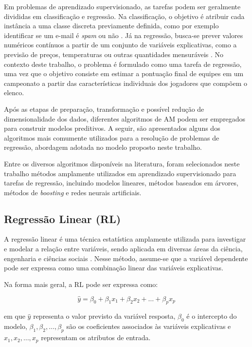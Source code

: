 Em problemas de aprendizado supervisionado, as tarefas podem ser geralmente divididas em classificação e regressão. Na classificação, o objetivo é atribuir 
cada instância a uma classe discreta previamente definida, como por exemplo identificar se um e-mail é \textit{spam} ou não \cite{Geron2019}. 
Já na regressão, busca-se prever valores numéricos 
contínuos a partir de um conjunto de variáveis explicativas, como a previsão de preços, temperaturas ou outras 
quantidades mensuráveis \cite{Geron2019}. No contexto deste trabalho, o problema é formulado como uma tarefa de regressão, 
uma vez que o objetivo consiste em estimar a pontuação final de equipes em um campeonato a partir das características 
individuais dos jogadores que compõem o elenco.

Após as etapas de preparação, transformação e possível redução de dimensionalidade dos dados, diferentes algoritmos de AM podem ser 
empregados para construir modelos preditivos. A seguir, são apresentados alguns dos algoritmos mais comumente utilizados para a resolução de problemas de 
regressão, abordagem adotada no modelo proposto neste trabalho.

Entre os diversos algoritmos disponíveis na literatura, foram selecionados neste trabalho métodos amplamente utilizados em aprendizado supervisionado 
para tarefas de regressão, incluindo modelos lineares, métodos baseados em árvores, métodos de \textit{boosting} e redes neurais artificiais.

\subsection{Regressão Linear (RL)}

A regressão linear é uma técnica estatística amplamente utilizada para investigar e modelar a relação entre variáveis, sendo aplicada em diversas áreas da ciência, 
engenharia e ciências sociais \cite{Montgomery2012}. Nesse método, assume-se que a variável dependente pode ser expressa como uma combinação 
linear das variáveis explicativas.

Na forma mais geral, a RL pode ser expressa como:

\begin{equation}
\hat{y} = \beta_0 + \beta_1 x_1 + \beta_2 x_2 + \dots + \beta_p x_p
\end{equation}

em que $\hat{y}$ representa o valor previsto da variável resposta, $\beta_0$ é o intercepto do modelo, $\beta_1, \beta_2, \dots, \beta_p$ são os coeficientes 
associados às variáveis explicativas e $x_1, x_2, \dots, x_p$ representam os atributos de entrada.

